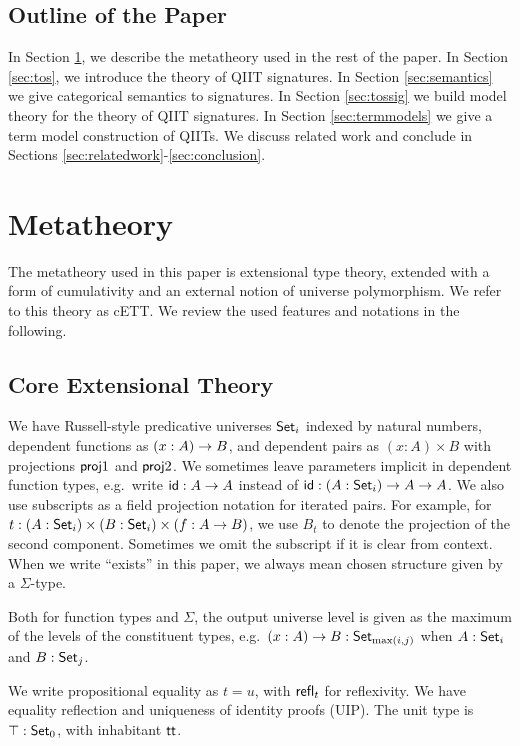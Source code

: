 \documentclass[sigplan,review,anonymous]{acmart}\settopmatter{printfolios=true,printccs=false,printacmref=false}
\begin{document}
\subsection{Outline of the Paper}

In Section \ref{sec:metatheory}, we describe the metatheory used in the rest of
the paper. In Section \ref{sec:tos}, we introduce the theory of QIIT
signatures. In Section \ref{sec:semantics} we give categorical semantics to
signatures. In Section \ref{sec:tossig} we build model theory for the theory
of QIIT signatures. In Section \ref{sec:termmodels} we give a term model construction
of QIITs. We discuss related work and conclude in Sections \ref{sec:relatedwork}-\ref{sec:conclusion}.

\section{Metatheory}
\label{sec:metatheory}

The metatheory used in this paper is extensional type theory, extended with a
form of cumulativity and an external notion of universe polymorphism. We refer
to this theory as cETT. We review the used features and notations
in the following.

\subsection{Core Extensional Theory}

We have Russell-style predicative universes $\Set_i$ indexed by natural
numbers, dependent functions as $(x : A)\ra B$, and dependent pairs as $(x :
A)\times B$ with projections $\proj1$ and $\proj2$. We sometimes leave
parameters implicit in dependent function types, e.g.\ write $\id : A \ra A$
instead of $\id : (A : \Set_i)\ra A \ra A$. We also use subscripts as a field
projection notation for iterated pairs. For example, for $t : (A : \Set_i)
\times (B : \Set_i) \times (f : A \ra B)$, we use $B_t$ to denote the projection
of the second component. Sometimes we omit the subscript if it is clear from
context. When we write ``exists'' in this paper, we always mean chosen structure
given by a $\Sigma$-type.

Both for function types and $\Sigma$, the output universe level is given as the
maximum of the levels of the constituent types, e.g.\ $(x : A)\ra B : \Set_{\max(i,j)}$
when $A : \Set_i$ and $B : \Set_j$.

We write propositional equality as $t = u$, with $\refl_t$ for reflexivity. We
have equality reflection and uniqueness of identity proofs (UIP). The unit type
is $\top : \Set_0$, with inhabitant $\tt$.
\end{document}
